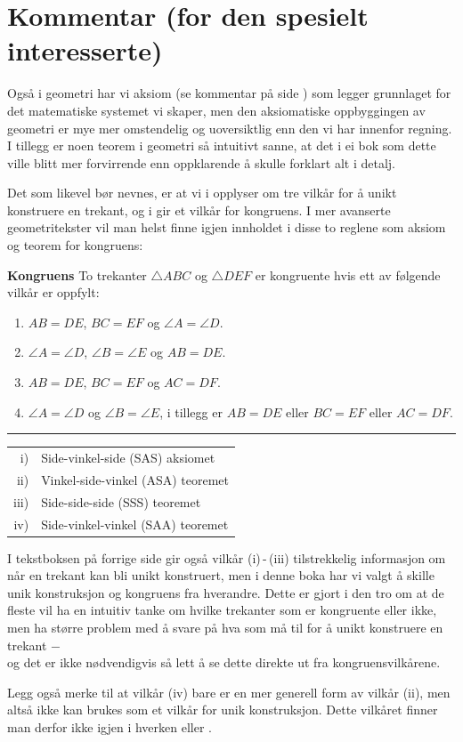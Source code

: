 




\section*{Kommentar (for den spesielt interesserte)}
Også i geometri har vi aksiom (se kommentar på side \pageref{Kommentar1}) som legger grunnlaget for det matematiske systemet vi skaper, men den aksiomatiske oppbyggingen av geometri er mye mer omstendelig og uoversiktlig enn den vi har innenfor regning. I tillegg er noen teorem i geometri så intuitivt sanne, at det i ei bok som dette ville blitt mer forvirrende enn oppklarende å skulle forklart alt i detalj.\vsk

Det som likevel bør nevnes, er at vi i  opplyser om tre vilkår for å unikt konstruere en trekant, og i  gir et vilkår for kongruens. I mer avanserte geometritekster vil man helst finne igjen innholdet i disse to reglene som aksiom og teorem for kongruens: \regv

\begin{tcolorbox}[boxrule=0.3 mm,arc=0mm,colback=blue!5] {\large \textbf{Kongruens} \vspace{5 pt}}\newline
	To trekanter $ \triangle ABC $ og $ \triangle DEF $ er kongruente hvis ett av følgende vilkår er oppfylt:
	\begin{enumerate}[label=\roman*)]
		\item $ AB=DE $, $ BC=EF $ og $ \angle A=\angle D $.
		\item $ \angle A=\angle D $, $ \angle B=\angle E $ og $ AB=DE $.
		\item $ AB=DE $, $ BC=EF $ og $ AC=DF $.
		\item $ {\angle A=\angle D} $ og $ {\angle B=\angle E} $, i tillegg er $ {AB=DE} $ eller $ BC=EF $ eller $ AC=DF $.
	\end{enumerate}
	 \vs
\rule{1\linewidth}{0.75bp}
\begin{center}
	\begin{tabular}{rl}
		i) &Side-vinkel-side (SAS) aksiomet\\
		ii) &Vinkel-side-vinkel (ASA) teoremet\\
		iii) & Side-side-side (SSS) teoremet \\
		iv) & Side-vinkel-vinkel (SAA) teoremet 
	\end{tabular}
\end{center}
\end{tcolorbox}
\newpage
I tekstboksen på forrige side gir også vilkår (i)\,-\,(iii) tilstrekkelig informasjon om når en trekant kan bli unikt konstruert, men i denne boka har vi valgt å skille unik konstruksjon og kongruens fra hverandre. Dette er gjort i den tro om at de fleste vil ha en intuitiv tanke om hvilke trekanter som er kongruente eller ikke, men ha større problem med å svare på hva som må til for å unikt konstruere en trekant $ - $ \\og det er ikke nødvendigvis så lett å se dette direkte ut fra kongruensvilkårene.\vsk

Legg også merke til at vilkår (iv) bare er en mer generell form av vilkår (ii), men altså ikke kan brukes som et vilkår for unik konstruksjon. Dette vilkåret finner man derfor ikke igjen i hverken  eller .


